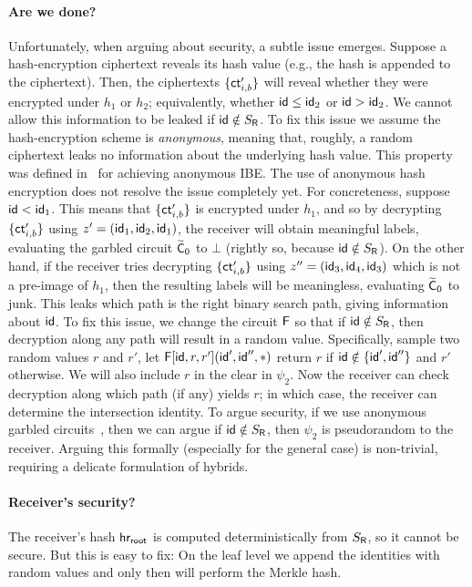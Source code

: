 \paragraph{Are we done?} Unfortunately, when arguing about security, a subtle issue emerges. Suppose a hash-encryption ciphertext reveals its hash value (e.g., the hash is appended to the ciphertext). Then, the ciphertexts $\{\mathsf{ct}'_{i,b} \}$ will reveal whether they were encrypted under $h_1$ or $h_2$;  equivalently, whether $\mathsf{id} \leq \mathsf{id}_2$ or $\mathsf{id} > \mathsf{id}_2$. We cannot allow this information to be leaked if $\mathsf{id} \notin S_{\mathsf{R}}$. To fix this issue we  assume the hash-encryption scheme is \emph{anonymous}, meaning that, roughly, a random ciphertext leaks no information about the underlying hash value. This property was defined in~\cite{EC:BLSV18} for achieving anonymous IBE. The use of anonymous hash encryption does not resolve the issue completely yet. For concreteness, suppose $\mathsf{id} < \mathsf{id}_1$. This means that $\{\mathsf{ct}'_{i,b} \}$ is encrypted under $h_1$, and so by decrypting $\{\mathsf{ct}'_{i,b} \}$ using  $z' = (\mathsf{id}_1, \mathsf{id}_2, \mathsf{id}_1)$, the receiver will obtain meaningful labels, evaluating the garbled circuit $\widetilde{\mathsf{C}}_0$ to $\bot$ (rightly so, because $\mathsf{id} \notin S_{\mathsf{R}}$). On the other hand, if the receiver tries decrypting $\{\mathsf{ct}'_{i,b} \}$ using  $z'' = (\mathsf{id}_3, \mathsf{id}_4, \mathsf{id}_3)$ which is not a pre-image of $h_1$, then the resulting labels will be meaningless, evaluating $\widetilde{\mathsf{C}}_0$ to  junk. This leaks which path is the right binary search path, giving information about $\mathsf{id}$. To fix this issue, we change the circuit $\mathsf{F}$ so that if $\mathsf{id} \notin S_{\mathsf{R}}$, then decryption along any path will result in a random value. Specifically, sample two random values $r$ and $r'$, let $\mathsf{F}[\mathsf{id}, r, r'](\mathsf{id}', \mathsf{id}'', *)$ return $r$ if $\mathsf{id} \notin \{ \mathsf{id}' , \mathsf{id}'' \}$ and $r'$ otherwise. We will also include $r$ in the clear in $\psi_2$. Now the receiver can check decryption along which path (if any) yields $r$; in which case, the receiver can determine the intersection identity. To argue security, if we use anonymous garbled circuits~\cite{EC:BLSV18}, then we can argue if $\mathsf{id} \notin S_{\mathsf{R}}$, then $\psi_2$ is pseudorandom to the receiver. Arguing this formally (especially for the general case) is non-trivial, requiring a delicate formulation of hybrids.

\paragraph{Receiver's security?} The receiver's hash  $\mathsf{hr_{root}}$ is computed deterministically from $S_{\mathsf{R}}$, so it cannot be secure. But this is easy to fix: On the leaf level we append the identities with random values and only then will  perform the Merkle hash.


